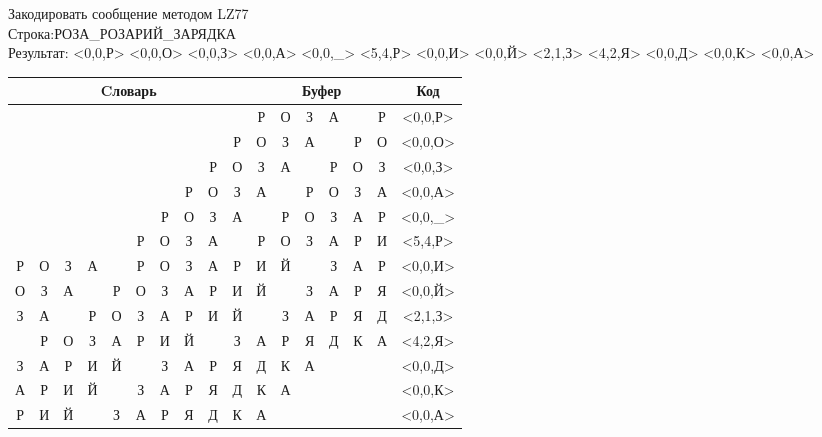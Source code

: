 \documentclass[a4paper, 12pt]{article}
\begin{document}
Закодировать сообщение методом LZ77\\
Строка:РОЗА\_РОЗАРИЙ\_ЗАРЯДКА\\
Результат: <0,0,Р> <0,0,О> <0,0,З> <0,0,А> <0,0,\_> <5,4,Р> <0,0,И> <0,0,Й> <2,1,З> <4,2,Я> <0,0,Д> <0,0,К> <0,0,А>\\
\begin{table}[h!]
\centering
\begin{tabular}{|c|c|c|c|c|c|c|c|c|c|c|c|c|c|c|c|c|} 
\hline
\multicolumn{10}{|c|}{Cловарь} & \multicolumn{6}{c|}{Буфер} & Код  \\ \hline
  &   &   &   &   &   &   &   &   &   & \cellcolor[HTML]{8CE4F6} Р & О & З & А &   & Р & <0,0,Р>
\\ \hline
  &   &   &   &   &   &   &   &   & Р & \cellcolor[HTML]{8CE4F6} О & З & А &   & Р & О & <0,0,О>
\\ \hline
  &   &   &   &   &   &   &   & Р & О & \cellcolor[HTML]{8CE4F6} З & А &   & Р & О & З & <0,0,З>
\\ \hline
  &   &   &   &   &   &   & Р & О & З & \cellcolor[HTML]{8CE4F6} А &   & Р & О & З & А & <0,0,А>
\\ \hline
  &   &   &   &   &   & Р & О & З & А & \cellcolor[HTML]{8CE4F6}   & Р & О & З & А & Р & <0,0,\_>
\\ \hline
  &   &   &   &   & \cellcolor[HTML]{FFFF00} Р & \cellcolor[HTML]{FFFF00} О & \cellcolor[HTML]{FFFF00} З & \cellcolor[HTML]{FFFF00} А &   & \cellcolor[HTML]{FFFF00} Р & \cellcolor[HTML]{FFFF00} О & \cellcolor[HTML]{FFFF00} З & \cellcolor[HTML]{FFFF00} А & \cellcolor[HTML]{8CE4F6} Р & И & <5,4,Р>
\\ \hline
Р & О & З & А &   & Р & О & З & А & Р & \cellcolor[HTML]{8CE4F6} И & Й &   & З & А & Р & <0,0,И>
\\ \hline
О & З & А &   & Р & О & З & А & Р & И & \cellcolor[HTML]{8CE4F6} Й &   & З & А & Р & Я & <0,0,Й>
\\ \hline
З & А & \cellcolor[HTML]{FFFF00}   & Р & О & З & А & Р & И & Й & \cellcolor[HTML]{FFFF00}   & \cellcolor[HTML]{8CE4F6} З & А & Р & Я & Д & <2,1,З>
\\ \hline
  & Р & О & З & \cellcolor[HTML]{FFFF00} А & \cellcolor[HTML]{FFFF00} Р & И & Й &   & З & \cellcolor[HTML]{FFFF00} А & \cellcolor[HTML]{FFFF00} Р & \cellcolor[HTML]{8CE4F6} Я & Д & К & А & <4,2,Я>
\\ \hline
З & А & Р & И & Й &   & З & А & Р & Я & \cellcolor[HTML]{8CE4F6} Д & К & А &   &   &   & <0,0,Д>
\\ \hline
А & Р & И & Й &   & З & А & Р & Я & Д & \cellcolor[HTML]{8CE4F6} К & А &   &   &   &   & <0,0,К>
\\ \hline
Р & И & Й &   & З & А & Р & Я & Д & К & \cellcolor[HTML]{8CE4F6} А &   &   &   &   &   & <0,0,А>
\\ \hline
\end{tabular}
\end{table}
\end{document}

